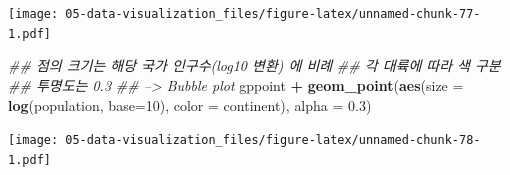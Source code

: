 \documentclass[
  11pt,
]{krantz}
\newenvironment{Shaded}{\begin{snugshade}}{\end{snugshade}}
\newcommand{\CharTok}[1]{\textcolor[rgb]{0.5,0.5,0.5}{#1}}
\newcommand{\CommentTok}[1]{\textcolor[rgb]{0.37,0.37,0.37}{\textit{#1}}}
\newcommand{\DataTypeTok}[1]{\textcolor[rgb]{0.27,0.27,0.27}{#1}}
\newcommand{\DecValTok}[1]{\textcolor[rgb]{0.06,0.06,0.06}{#1}}
\newcommand{\FloatTok}[1]{\textcolor[rgb]{0.06,0.06,0.06}{#1}}
\newcommand{\KeywordTok}[1]{\textcolor[rgb]{0.27,0.27,0.27}{\textbf{#1}}}
\newcommand{\NormalTok}[1]{#1}
\newcommand{\OperatorTok}[1]{\textcolor[rgb]{0.43,0.43,0.43}{\textbf{#1}}}
\newcommand{\StringTok}[1]{\textcolor[rgb]{0.5,0.5,0.5}{#1}}
\begin{document}
\begin{Shaded}
\end{Shaded}

\texttt{[image: 05-data-visualization\_files/figure-latex/unnamed-chunk-77-1.pdf]}

\normalsize

\footnotesize

\begin{Shaded}
\begin{Highlighting}[]
\CommentTok{## 점의 크기는 해당 국가 인구수(log10 변환) 에 비례}
\CommentTok{## 각 대륙에 따라 색 구분}
\CommentTok{## 투명도는 0.3}
\CommentTok{## --> Bubble plot}
\NormalTok{gppoint }\OperatorTok{+}\StringTok{ }
\StringTok{  }\KeywordTok{geom_point}\NormalTok{(}\KeywordTok{aes}\NormalTok{(}\DataTypeTok{size =} \KeywordTok{log}\NormalTok{(population, }\DataTypeTok{base=}\DecValTok{10}\NormalTok{), }
                 \DataTypeTok{color =}\NormalTok{ continent), }
             \DataTypeTok{alpha =} \FloatTok{0.3}\NormalTok{)}
\end{Highlighting}
\end{Shaded}

\texttt{[image: 05-data-visualization\_files/figure-latex/unnamed-chunk-78-1.pdf]}

\normalsize

\footnotesize
\end{document}
